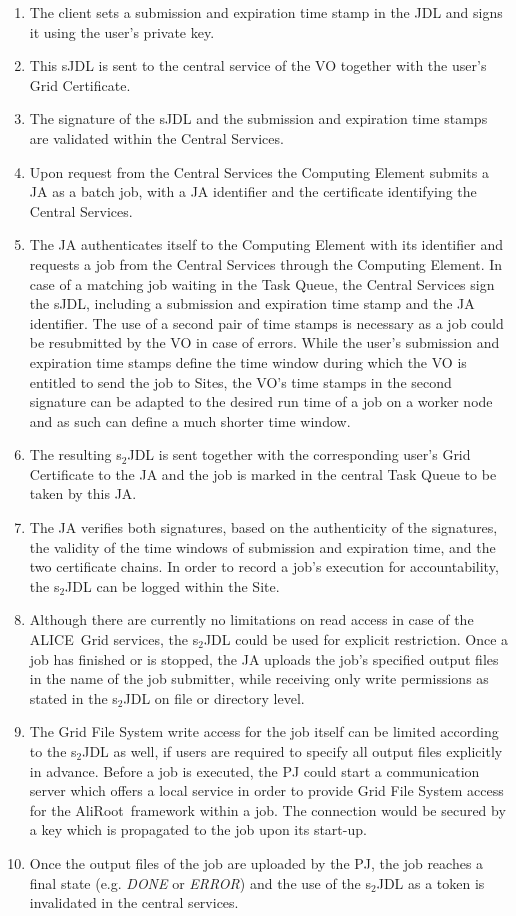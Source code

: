 \documentclass[10pt]{iopart}
\newcommand{\alice}{ALICE}
\newcommand{\aliroot}{AliRoot}
\begin{document}
\begin{enumerate}[{Step} 1{:}]
\item The client sets a submission and expiration time stamp in the JDL and
signs it using the user's private key.
\item This sJDL is sent to the central service of
the VO together with the user's Grid Certificate.
\item The signature of the sJDL and the submission and expiration time stamps
are validated within the Central Services.
\item Upon request from the Central Services
the Computing Element submits a JA as a batch job,
with a JA identifier and the certificate identifying the Central Services.
\item The JA authenticates itself to the Computing Element with its
identifier and requests a job from the Central Services through the Computing
Element. In case of a matching job waiting in the Task Queue, the Central
Services sign the sJDL, including a submission and expiration time stamp
and the JA identifier. The use of a second pair of time stamps is
necessary as a job could be resubmitted by the VO in case of errors.
While the user's submission and expiration time stamps define the
time window during which
the VO is entitled to send the job to Sites, the VO's time stamps
in the second signature can be adapted to the desired run time of a job on a
worker node and as such can define a much shorter time window. 
\item The resulting s$_2$JDL is sent together with the corresponding user's Grid
Certificate to the JA and the job
is marked in the central Task Queue to be taken by this JA.  
\item The JA verifies both signatures, based on the authenticity of the
signatures, the validity of the time windows of submission and
expiration time, and the two certificate chains. In order to record a job's 
execution for accountability, the s$_2$JDL can be logged within the Site.
\item Although there are currently no limitations on read access 
in case of the \alice\ Grid services, the s$_2$JDL could be used for 
explicit restriction. Once a job has finished or is stopped, the JA
uploads the job's specified output files in the name of the job submitter,
while receiving
only write permissions as stated in the s$_2$JDL on file or directory level.
\item The Grid File System write access for the job itself can be
limited according to the s$_2$JDL as well, if users are required to specify all
output files explicitly in advance. Before a job is executed, the PJ could start
a communication
server which offers a local service in order to
provide Grid File System access for the \aliroot\ framework within a job.
The connection would be secured by a key which is propagated to the job upon
its start-up.
\item Once the output files of the job are uploaded by the PJ,
the job reaches a final state (e.g. \textit{DONE} or
\textit{ERROR}) and the use of the s$_2$JDL as a token is invalidated in the
central services.
\end{enumerate}
\end{document}

